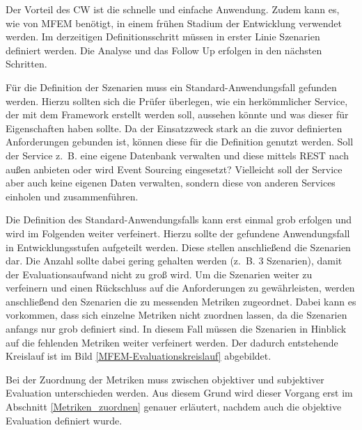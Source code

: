 Der Vorteil des \ac{CW} ist die schnelle und einfache Anwendung. Zudem kann es, wie von \ac{MFEM} benötigt, in einem frühen Stadium der Entwicklung verwendet werden.\cite{Wharton1994} 
Im derzeitigen Definitionsschritt müssen in erster Linie Szenarien definiert werden. Die Analyse und das Follow Up erfolgen in den nächsten Schritten.

\label{Definition_Szenarien}

Für die Definition der Szenarien muss ein Standard-Anwendungsfall gefunden werden. Hierzu sollten sich die Prüfer überlegen, wie ein herkömmlicher Service, der mit dem Framework erstellt werden soll, aussehen könnte und was dieser für Eigenschaften haben sollte. Da der Einsatzzweck stark an die zuvor definierten Anforderungen gebunden ist, können diese für die Definition genutzt werden. Soll der Service z.~B. eine eigene Datenbank verwalten und diese mittels \ac{REST} nach außen anbieten oder wird Event Sourcing eingesetzt? Vielleicht soll der Service aber auch keine eigenen Daten verwalten, sondern diese von anderen Services einholen und zusammenführen.

Die Definition des Standard-Anwendungsfalls kann erst einmal grob erfolgen und wird im Folgenden weiter verfeinert. Hierzu sollte der gefundene Anwendungsfall in Entwicklungsstufen aufgeteilt werden. Diese stellen anschließend die Szenarien dar. Die Anzahl sollte dabei gering gehalten werden (z.~B. 3 Szenarien), damit der Evaluationsaufwand nicht zu groß wird. Um die Szenarien weiter zu verfeinern und einen Rückschluss auf die Anforderungen zu gewährleisten, werden anschließend den Szenarien die zu messenden Metriken zugeordnet. Dabei kann es vorkommen, dass sich einzelne Metriken nicht zuordnen lassen, da die Szenarien anfangs nur grob definiert sind. In diesem Fall müssen die Szenarien in Hinblick auf die fehlenden Metriken weiter verfeinert werden. Der dadurch entstehende Kreislauf ist im Bild \ref{MFEM-Evaluationskreislauf} abgebildet.       


Bei der Zuordnung der Metriken muss zwischen objektiver und subjektiver Evaluation unterschieden werden. Aus diesem Grund wird dieser Vorgang erst im Abschnitt \ref{Metriken_zuordnen} genauer erläutert, nachdem auch die objektive Evaluation definiert wurde.

